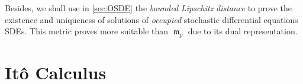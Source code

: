 \documentclass[11pt]{article}
\theoremstyle{plain}
\theoremstyle{definition}
\DeclareMathOperator{\frakm}{\mathfrak{m}}
\begin{document}
Besides, we shall use in \cref{sec:OSDE} the  \textit{bounded Lipschitz}  \textit{distance} \cite{Hanin} to prove  
   the existence and uniqueness of solutions of \textit{occupied} stochastic differential equations SDEs.  This metric proves    
   more suitable than 
   $\frakm_p$ due to its dual representation.


\section{It\^o Calculus}\label{sec:ITOMAIN}


 


 
\end{document}
